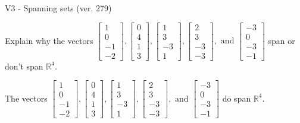 \begin{exercise}
  \begin{exerciseTitle}V3 - Spanning sets (ver. 279)\end{exerciseTitle}
  \begin{exerciseStatement}
    Explain why the vectors \(\left[\begin{array}{r}
1 \\
0 \\
-1 \\
-2
\end{array}\right] , \left[\begin{array}{r}
0 \\
4 \\
1 \\
3
\end{array}\right] , \left[\begin{array}{r}
1 \\
3 \\
-3 \\
1
\end{array}\right] , \left[\begin{array}{r}
2 \\
3 \\
-3 \\
-3
\end{array}\right] , \text{ and } \left[\begin{array}{r}
-3 \\
0 \\
-3 \\
-1
\end{array}\right]\) span or don't span \(\mathbb{R}^4\). 
	


  \end{exerciseStatement}
  \begin{exerciseAnswer}
   The vectors \(\left[\begin{array}{r}
1 \\
0 \\
-1 \\
-2
\end{array}\right] , \left[\begin{array}{r}
0 \\
4 \\
1 \\
3
\end{array}\right] , \left[\begin{array}{r}
1 \\
3 \\
-3 \\
1
\end{array}\right] , \left[\begin{array}{r}
2 \\
3 \\
-3 \\
-3
\end{array}\right] , \text{ and } \left[\begin{array}{r}
-3 \\
0 \\
-3 \\
-1
\end{array}\right]\) 
  	 do  
	span \(\mathbb{R}^4\).
  



\end{exerciseAnswer}
\end{exercise}
